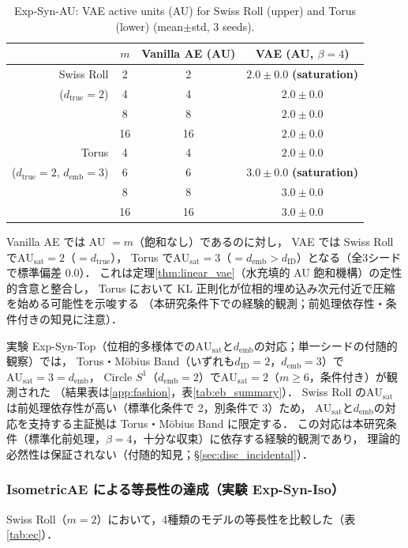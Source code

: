 \documentclass[11pt,a4paper]{jsarticle}
\newcommand{\dID}{d_{\mathrm{ID}}}
\newcommand{\dtrue}{d_{\mathrm{true}}}
\newcommand{\AUsat}{\mathrm{AU}_{\mathrm{sat}}}
\newcommand{\demb}{d_{\mathrm{emb}}}
\begin{document}
\begin{table}[H]
\centering
\caption{Exp-Syn-AU: VAE active units (AU) for Swiss Roll (upper) and Torus (lower) (mean$\pm$std, 3 seeds).}
\label{tab:ea_summary}
\small
\begin{tabular}{rccc}
\toprule
 & $m$ & Vanilla AE (AU) & VAE (AU, $\beta=4$) \\
\midrule
Swiss Roll & 2 & 2 & $2.0\pm0.0$ \textbf{(saturation)} \\
($d_\mathrm{true}=2$) & 4 & 4 & $2.0\pm0.0$ \\
 & 8 & 8 & $2.0\pm0.0$ \\
 & 16 & 16 & $2.0\pm0.0$ \\
\midrule
Torus & 4 & 4 & $2.0\pm0.0$ \\
($d_\mathrm{true}=2$, $d_\mathrm{emb}=3$) & 6 & 6 & $3.0\pm0.0$ \textbf{(saturation)} \\
 & 8 & 8 & $3.0\pm0.0$ \\
 & 16 & 16 & $3.0\pm0.0$ \\
\bottomrule
\end{tabular}
\end{table}

Vanilla AE では AU $= m$（飽和なし）であるのに対し，
VAE では Swiss Roll で$\AUsat = 2$（$= \dtrue$），
Torus で$\AUsat = 3$（$= \demb > \dID$）となる（全3シードで標準偏差 0.0）．
これは定理\ref{thm:linear_vae}（水充填的 AU 飽和機構）の定性的含意と整合し，
Torus において KL 正則化が位相的埋め込み次元付近で圧縮を始める可能性を示唆する
（本研究条件下での経験的観測；前処理依存性・条件付きの知見に注意）．

実験 Exp-Syn-Top（位相的多様体での$\AUsat$と$\demb$の対応；単一シードの付随的観察）では，
Torus・Möbius Band（いずれも$\dID = 2$，$\demb = 3$）で$\AUsat = 3 = \demb$，
Circle $S^1$（$\demb = 2$）で$\AUsat = 2$（$m \geq 6$，条件付き）が観測された
（結果表は\ref{app:fashion}，表\ref{tab:eb_summary}）．
Swiss Roll の$\AUsat$は前処理依存性が高い（標準化条件で 2，別条件で 3）ため，
$\AUsat$と$\demb$の対応を支持する主証拠は Torus・Möbius Band に限定する．
この対応は本研究条件（標準化前処理，$\beta = 4$，十分な収束）に依存する経験的観測であり，
理論的必然性は保証されない（付随的知見；§\ref{sec:disc_incidental}）．

\subsubsection{IsometricAE による等長性の達成（実験 Exp-Syn-Iso）}

Swiss Roll（$m = 2$）において，4種類のモデルの等長性を比較した（表\ref{tab:ec}）．
\end{document}
